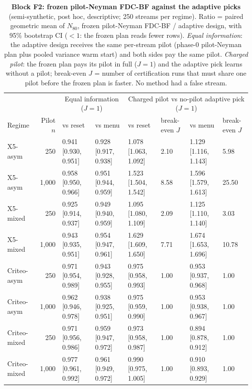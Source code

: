 \begin{table}[t]
\caption{\textbf{Block F2: frozen pilot-Neyman FDC-BF against the adaptive picks} (semi-synthetic, post hoc, descriptive; 250 streams per regime). Ratio = paired geometric mean of $N_{80}$, frozen pilot-Neyman FDC-BF / adaptive design, with 95\% bootstrap CI ($<1$: the frozen plan reads fewer rows). \emph{Equal information}: the adaptive design receives the same per-stream pilot (phase-0 pilot-Neyman plan plus pooled variance warm start) and both sides pay the same pilot. \emph{Charged pilot}: the frozen plan pays its pilot in full ($J = 1$) and the adaptive pick learns without a pilot; break-even $J$ = number of certification runs that must share one pilot before the frozen plan is faster. No method had a false stream.}
\label{tab:posthocF2h2h}
\small
\setlength{\tabcolsep}{3pt}
\begin{tabular}{@{}lrllllll@{}}
\toprule
& & \multicolumn{2}{c}{Equal information ($J = 1$)} & \multicolumn{4}{c}{Charged pilot vs no-pilot adaptive pick ($J = 1$)} \\
Regime & Pilot $n$ & vs reset & vs menu & vs reset & break-even $J$ & vs menu & break-even $J$ \\
\midrule
X5-asym & 250 & 0.941 {\scriptsize[0.930, 0.951]} & 0.928 {\scriptsize[0.917, 0.938]} & 1.078 {\scriptsize[1.063, 1.092]} & 2.10 & 1.129 {\scriptsize[1.116, 1.143]} & 5.98 \\
X5-asym & 1,000 & 0.958 {\scriptsize[0.950, 0.966]} & 0.951 {\scriptsize[0.944, 0.959]} & 1.523 {\scriptsize[1.504, 1.542]} & 8.58 & 1.596 {\scriptsize[1.579, 1.613]} & 25.50 \\
X5-mixed & 250 & 0.925 {\scriptsize[0.914, 0.937]} & 0.949 {\scriptsize[0.940, 0.959]} & 1.095 {\scriptsize[1.080, 1.109]} & 2.09 & 1.125 {\scriptsize[1.110, 1.140]} & 3.03 \\
X5-mixed & 1,000 & 0.943 {\scriptsize[0.935, 0.951]} & 0.954 {\scriptsize[0.947, 0.961]} & 1.629 {\scriptsize[1.609, 1.650]} & 7.71 & 1.674 {\scriptsize[1.653, 1.696]} & 10.78 \\
Criteo-asym & 250 & 0.971 {\scriptsize[0.954, 0.989]} & 0.943 {\scriptsize[0.928, 0.955]} & 0.975 {\scriptsize[0.958, 0.993]} & 1.00 & 0.953 {\scriptsize[0.937, 0.968]} & 1.00 \\
Criteo-asym & 1,000 & 0.962 {\scriptsize[0.946, 0.978]} & 0.938 {\scriptsize[0.925, 0.951]} & 0.975 {\scriptsize[0.959, 0.990]} & 1.00 & 0.953 {\scriptsize[0.938, 0.967]} & 1.00 \\
Criteo-mixed & 250 & 0.971 {\scriptsize[0.956, 0.986]} & 0.959 {\scriptsize[0.947, 0.972]} & 0.973 {\scriptsize[0.958, 0.987]} & 1.00 & 0.894 {\scriptsize[0.878, 0.912]} & 1.00 \\
Criteo-mixed & 1,000 & 0.977 {\scriptsize[0.961, 0.992]} & 0.961 {\scriptsize[0.949, 0.972]} & 0.990 {\scriptsize[0.975, 1.005]} & 1.00 & 0.910 {\scriptsize[0.893, 0.929]} & 1.00 \\
\bottomrule
\end{tabular}
\end{table}
